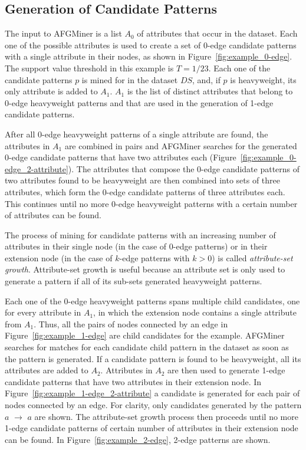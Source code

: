 \subsection{Generation of Candidate Patterns}
The input to AFGMiner is a list $A_0$ of attributes that occur in the dataset. Each one of the possible attributes is used to create a set of 0-edge candidate patterns with a single attribute in their nodes, as shown in Figure~\ref{fig:example_0-edge}. The support value threshold in this example is $T = 1/23$. Each one of the candidate patterns $p$ is mined for in the dataset $DS$, and, if $p$ is heavyweight, its only attribute is added to $A_1$. $A_1$ is the list of distinct attributes that belong to 0-edge heavyweight patterns and that are used in the generation of 1-edge candidate patterns. 

After all 0-edge heavyweight patterns of a single attribute are found, the attributes in $A_1$ are combined in pairs and AFGMiner searches for the generated 0-edge candidate patterns that have two attributes each (Figure~\ref{fig:example_0-edge_2-attribute}). The attributes that compose the 0-edge candidate patterns of two attributes found to be heavyweight are then combined into sets of three attributes, which form the 0-edge candidate patterns of three attributes each. This continues until no more 0-edge heavyweight patterns with a certain number of attributes can be found. 

The process of mining for candidate patterns with an increasing number of attributes in their single node (in the case of 0-edge patterns) or in their extension node (in the case of $k$-edge patterns with $k > 0$) is called \emph{attribute-set growth}. Attribute-set growth is useful because an attribute set is only used to generate a pattern if all of its sub-sets generated heavyweight patterns. 

Each one of the 0-edge heavyweight patterns spans multiple child candidates, one for every attribute in $A_1$, in which the extension node contains a single attribute from $A_1$. Thus, all the pairs of nodes connected by an edge in Figure~\ref{fig:example_1-edge} are child candidates for the example. AFGMiner searches for matches for each candidate child pattern in the dataset as soon as the pattern is generated. If a candidate pattern is found to be heavyweight, all its attributes are added to $A_2$. Attributes in $A_2$ are then used to generate 1-edge candidate patterns that have two attributes in their extension node.  In Figure~\ref{fig:example_1-edge_2-attribute} a candidate is generated for each pair of nodes connected by an edge. For clarity, only candidates generated by the pattern $a$ $\rightarrow$ $a$ are shown. The attribute-set growth process then proceeds until no more 1-edge candidate patterns of certain number of attributes in their extension node can be found. In Figure~\ref{fig:example_2-edge}, 2-edge patterns are shown. 

